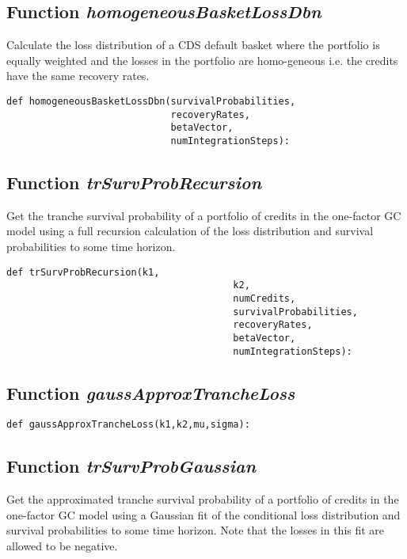 \documentclass[twoside,11pt]{book}
\begin{document}
\subsection{Function {\it homogeneousBasketLossDbn}}
Calculate the loss distribution of a CDS default basket where the portfolio is equally weighted and the losses in the portfolio are homo-geneous i.e. the credits have the same recovery rates. 

\begin{lstlisting}
def homogeneousBasketLossDbn(survivalProbabilities,
                             recoveryRates,
                             betaVector,
                             numIntegrationSteps):
\end{lstlisting}

\subsection{Function {\it trSurvProbRecursion}}
Get the tranche survival probability of a portfolio of credits in the one-factor GC model using a full recursion calculation of the loss distribution and survival probabilities to some time horizon. 

\begin{lstlisting}
def trSurvProbRecursion(k1,
                                        k2,
                                        numCredits,
                                        survivalProbabilities,
                                        recoveryRates,
                                        betaVector,
                                        numIntegrationSteps):
\end{lstlisting}

\subsection{Function {\it gaussApproxTrancheLoss}}


\begin{lstlisting}
def gaussApproxTrancheLoss(k1,k2,mu,sigma):
\end{lstlisting}

\subsection{Function {\it trSurvProbGaussian}}
Get the approximated tranche survival probability of a portfolio of credits in the one-factor GC model using a Gaussian fit of the conditional loss distribution and survival probabilities to some time horizon. Note that the losses in this fit are allowed to be negative. 
\end{document}
